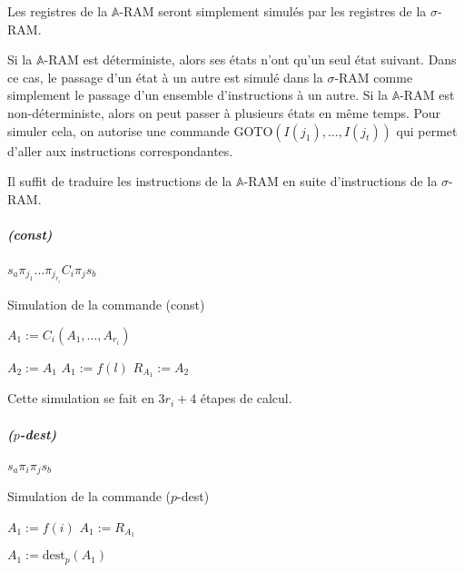 \documentclass{report}
\newcommand{\bbA}{\mathbb{A}}
\begin{document}
				\begin{demo}
					Les registres de la $\bbA$-RAM seront simplement simulés par les registres de la $\sigma$-RAM. 
					
					Si la $\bbA$-RAM est déterministe, alors ses états n'ont qu'un seul état suivant. Dans ce cas, le passage d'un état à un autre est simulé dans la $\sigma$-RAM comme simplement le passage d'un ensemble d'instructions à un autre. Si la $\bbA$-RAM est non-déterministe, alors on peut passer à plusieurs états en même temps. Pour simuler cela, on autorise une commande $\text{GOTO}(I(j_1), \dots, I(j_t))$ qui permet d'aller aux instructions correspondantes. 
					
					Il suffit de traduire les instructions de la $\bbA$-RAM en suite d'instructions de la $\sigma$-RAM.
					
					\subparagraph{(const)}
					$s_a \pi_{j_1} \dots \pi_{j_{r_i}} C_i \pi_j s_b$
					
					
					
					
					\begin{algorithm}[H]
						\caption{Simulation de la commande (const)}
						
						
							
						
						$A_1 := C_i (A_1, \dots, A_{r_i})$\;
						
						
						$A_2 := A_1$\;
						$A_1 := f(l)$\;
						$R_{A_1} := A_2$\;
					\end{algorithm}
					
					\espace
					
					Cette simulation se fait en $3r_i + 4$ étapes de calcul.

					
					\subparagraph{($p$-dest)}
					$s_a \pi_i \pi_j s_b$
					
					\begin{algorithm}[H]
						\caption{Simulation de la commande ($p$-dest)}
						
						$A_1 := f(i)$\;
						$A_1 := R_{A_1}$\;
						
						$A_1 := \text{dest}_p(A_1)$\;
						

\end{algorithm}
\end{demo}
\end{document}
